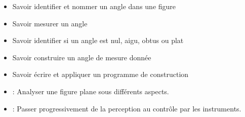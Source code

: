 \begin{myobj}
	\begin{itemize}
		
		\item Savoir identifier et nommer un angle dans une figure
		\item Savoir mesurer un angle
		\item Savoir identifier si un angle est nul, aigu, obtus ou plat
		\item Savoir construire un angle de mesure donnée
		\item Savoir écrire et appliquer un programme de construction		
	\end{itemize}
\end{myobj}

\begin{mycomp}
	\begin{itemize}
		
		\item {} :  Analyser une figure plane sous différents aspects.
		\item {} :  Passer progressivement de la perception au contrôle par les instruments.
		
	\end{itemize}
\end{mycomp}